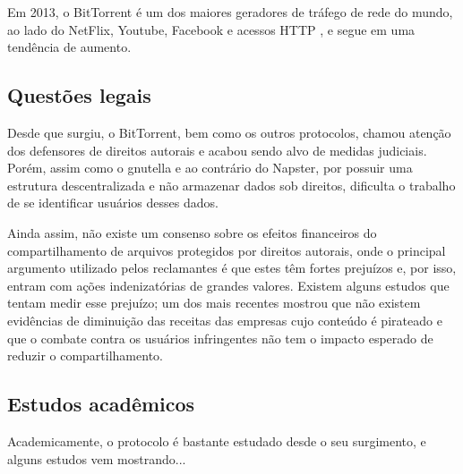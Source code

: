 Em 2013, o BitTorrent é um dos maiores geradores de tráfego de rede do mundo, ao lado
do NetFlix, Youtube, Facebook e acessos HTTP \cite{report:internet-usage-2013}, e segue
em uma tendência de aumento.

\subsection{Questões legais}

Desde que surgiu, o BitTorrent, bem como os outros protocolos, chamou atenção dos
defensores de direitos autorais e acabou sendo alvo de medidas judiciais. Porém, assim
como o \gls*{gnutella} e ao contrário do Napster, por possuir uma estrutura
descentralizada e não armazenar dados sob direitos, dificulta o trabalho de se
identificar usuários desses dados.

Ainda assim, não existe um consenso sobre os efeitos financeiros do compartilhamento de
arquivos protegidos por direitos autorais, onde o principal argumento utilizado pelos
reclamantes é que estes têm fortes prejuízos e, por isso, entram com ações
indenizatórias de grandes valores. Existem alguns estudos que tentam medir esse
prejuízo; um dos mais recentes mostrou que não existem evidências de diminuição
das receitas das empresas cujo conteúdo é pirateado e que o combate contra os usuários
infringentes não tem o impacto esperado de reduzir o compartilhamento.

\subsection{Estudos acadêmicos}

Academicamente, o protocolo é bastante estudado desde o seu surgimento, e alguns estudos
vem mostrando... 

\clearpage